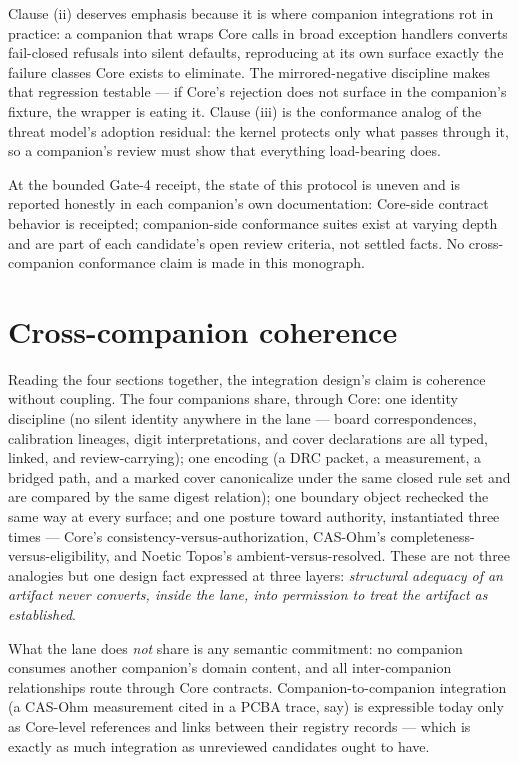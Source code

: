Clause (ii) deserves emphasis because it is where companion integrations rot in practice: a companion that wraps Core calls in broad exception handlers converts fail-closed refusals into silent defaults, reproducing at its own surface exactly the failure classes Core exists to eliminate. The mirrored-negative discipline makes that regression testable --- if Core's rejection does not surface in the companion's fixture, the wrapper is eating it. Clause (iii) is the conformance analog of the threat model's adoption residual: the kernel protects only what passes through it, so a companion's review must show that everything load-bearing does.

At the bounded Gate-4 receipt, the state of this protocol is uneven and is reported honestly in each companion's own documentation: Core-side contract behavior is receipted; companion-side conformance suites exist at varying depth and are part of each candidate's open review criteria, not settled facts. No cross-companion conformance claim is made in this monograph.

\section{Cross-companion coherence}\label{integ:coherence}

Reading the four sections together, the integration design's claim is coherence without coupling. The four companions share, through Core: one identity discipline (no silent identity anywhere in the lane --- board correspondences, calibration lineages, digit interpretations, and cover declarations are all typed, linked, and review-carrying); one encoding (a DRC packet, a measurement, a bridged path, and a marked cover canonicalize under the same closed rule set and are compared by the same digest relation); one boundary object rechecked the same way at every surface; and one posture toward authority, instantiated three times --- Core's consistency-versus-authorization, CAS-Ohm's completeness-versus-eligibility, and Noetic Topos's ambient-versus-resolved. These are not three analogies but one design fact expressed at three layers: \emph{structural adequacy of an artifact never converts, inside the lane, into permission to treat the artifact as established}.

What the lane does \emph{not} share is any semantic commitment: no companion consumes another companion's domain content, and all inter-companion relationships route through Core contracts. Companion-to-companion integration (a CAS-Ohm measurement cited in a PCBA trace, say) is expressible today only as Core-level references and links between their registry records --- which is exactly as much integration as unreviewed candidates ought to have.

